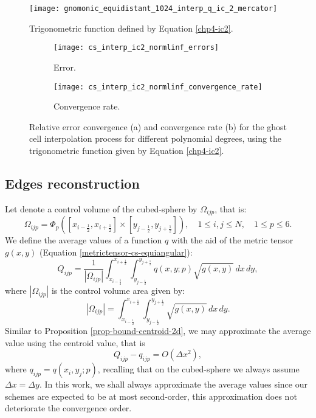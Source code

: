 \begin{figure}[!htb]
	\centering
	\texttt{[image: gnomonic\_equidistant\_1024\_interp\_q\_ic\_2\_mercator]}
	\caption{Trigonometric function defined by Equation \eqref{chp4-ic2}.}
	\label{chp4-cs-ic2}
\end{figure}

\begin{figure}[!htb]
	\centering
	\begin{subfigure}{0.45\textwidth}
		\centering
		\texttt{[image: cs\_interp\_ic2\_normlinf\_errors]}
		\caption{Error.\label{chp4-exp2-error}}
	\end{subfigure}
	\begin{subfigure}{0.45\textwidth}
		\centering
		\texttt{[image: cs\_interp\_ic2\_normlinf\_convergence\_rate]}
		\caption{Convergence rate.\label{chp4-exp2-CR}}
	\end{subfigure}
	\caption{Relative error convergence (a) and convergence rate (b) for the ghost cell interpolation process for different
		polynomial degrees, using the trigonometric function given by Equation \eqref{chp4-ic2}.\label{chp4-exp2}}
\end{figure}

\subsection{Edges reconstruction}
\label{cs-recon}
Let denote a control volume of the cubed-sphere by $\Omega_{ijp}$, that is:
\begin{equation*}
	\Omega_{ijp} = \Phi_p([x_{i-\frac{1}{2}}, x_{i+\frac{1}{2}}] \times [y_{j-\frac{1}{2}}, y_{j+\frac{1}{2}}]),
	\quad 1 \leq i, j \leq N, \quad 1 \leq p \leq 6.
\end{equation*}
We define the average values of a function $q$ with the aid of the metric tensor $g(x,y)$ (Equation \ref{metrictensor-cs-equiangular}):
\begin{equation*}
	Q_{ijp} = \frac{1}{|\Omega_{ijp}|}\int_{x_{i-\frac{1}{2}}}^{x_{i+\frac{1}{2}}}
	\int_{y_{j-\frac{1}{2}}}^{y_{j+\frac{1}{2}}}  q(x,y;p) \sqrt{g(x,y)}\,dx \,dy,
\end{equation*}
where $|\Omega_{ijp}|$ is the control volume area given by:
\begin{equation*}
	|\Omega_{ijp}| = \int_{x_{i-\frac{1}{2}}}^{x_{i+\frac{1}{2}}} \int_{y_{j-\frac{1}{2}}}^{y_{j+\frac{1}{2}}}\sqrt{g(x,y)} \,dx \,dy.
\end{equation*}
Similar to Proposition \ref{prop-bound-centroid-2d}, we may approximate the average value using the centroid value, that is
\begin{equation*}
	Q_{ijp} - q_{ijp} = O(\Delta x ^2), 
\end{equation*}
where $q_{ijp} = q(x_i,y_j; p)$, recalling that on the cubed-sphere we always assume $\Delta x = \Delta y$.
In this work, we shall always approximate the average values since our schemes are expected to be at most second-order,
this approximation does not deteriorate the convergence order.

